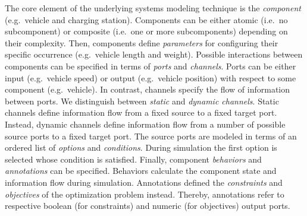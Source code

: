 The core element of the underlying systems modeling technique is the \textit{component} (e.g.\ vehicle and charging station). Components can be either atomic (i.e.\ no subcomponent) or composite (i.e.\ one or more subcomponents) depending on their complexity. Then, components define \textit{parameters} for configuring their specific occurrence (e.g.\ vehicle length and weight). Possible interactions between components can be specified in terms of \textit{ports} and \textit{channels}. Ports can be either input (e.g.\ vehicle speed) or output (e.g.\ vehicle position) with respect to some component (e.g.\ vehicle). In contrast, channels specify the flow of information between ports. We distinguish between \textit{static} and \textit{dynamic channels}. Static channels define information flow from a fixed source to a fixed target port. Instead, dynamic channels define information flow from a number of possible source ports to a fixed target port. The source ports are modeled in terms of an ordered list of \textit{options} and \textit{conditions}. During simulation the first option is selected whose condition is satisfied. Finally, component \textit{behaviors} and \textit{annotations} can be specified. Behaviors calculate the component state and information flow during simulation. Annotations defined the \textit{constraints} and \textit{objectives} of the optimization problem instead. Thereby, annotations refer to respective boolean (for constraints) and numeric (for objectives) output ports.